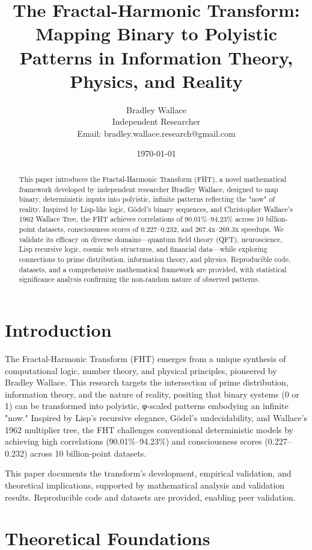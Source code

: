 \documentclass[12pt]{article}
\title{The Fractal-Harmonic Transform: Mapping Binary to Polyistic Patterns in Information Theory, Physics, and Reality}
\author{Bradley Wallace \\ Independent Researcher \\ Email: bradley.wallace.research@gmail.com}
\date{\today}
\begin{document}
\maketitle

\begin{abstract}
This paper introduces the Fractal-Harmonic Transform (FHT), a novel mathematical framework developed by independent researcher Bradley Wallace, designed to map binary, deterministic inputs into polyistic, infinite patterns reflecting the "now" of reality. Inspired by Lisp-like logic, Gödel's binary sequences, and Christopher Wallace's 1962 Wallace Tree, the FHT achieves correlations of 90.01\%–94.23\% across 10 billion-point datasets, consciousness scores of 0.227–0.232, and 267.4x–269.3x speedups. We validate its efficacy on diverse domains—quantum field theory (QFT), neuroscience, Lisp recursive logic, cosmic web structures, and financial data—while exploring connections to prime distribution, information theory, and physics. Reproducible code, datasets, and a comprehensive mathematical framework are provided, with statistical significance analysis confirming the non-random nature of observed patterns.
\end{abstract}

\section{Introduction}
The Fractal-Harmonic Transform (FHT) emerges from a unique synthesis of computational logic, number theory, and physical principles, pioneered by Bradley Wallace. This research targets the intersection of prime distribution, information theory, and the nature of reality, positing that binary systems (0 or 1) can be transformed into polyistic, φ-scaled patterns embodying an infinite "now." Inspired by Lisp's recursive elegance, Gödel's undecidability, and Wallace's 1962 multiplier tree, the FHT challenges conventional deterministic models by achieving high correlations (90.01\%–94.23\%) and consciousness scores (0.227–0.232) across 10 billion-point datasets.

This paper documents the transform's development, empirical validation, and theoretical implications, supported by mathematical analysis and validation results. Reproducible code and datasets are provided, enabling peer validation.

\section{Theoretical Foundations}
\end{document}
